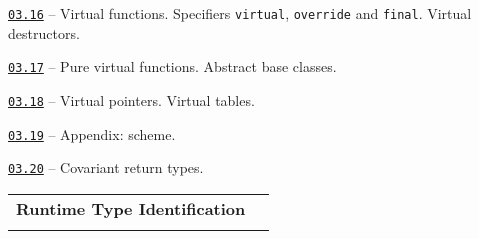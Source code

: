 \documentclass[a4paper,12pt]{article}
\renewenvironment{itemize}
{
    \begin{list}{\labelitemi}
    {
      \setlength{\topsep}{0pt}
      \setlength{\partopsep}{0pt}
      \setlength{\parskip}{0pt}
      \setlength{\itemsep}{0pt}
      \setlength{\parsep}{0pt}
      \setlength{\leftmargin}{14.5pt}
    }
}{\end{list}}
\begin{document}
\begin{itemize}

    \item \href{https://github.com/i-s-m-mipt/Education/blob/master/projects/examples/source/03.16.cpp}{\texttt{03.16}} -- Virtual functions. Specifiers \lstinline{virtual}, \lstinline{override} and \lstinline{final}. Virtual destructors.

    \smallskip

    \item \href{https://github.com/i-s-m-mipt/Education/blob/master/projects/examples/source/03.17.cpp}{\texttt{03.17}} -- Pure virtual functions. Abstract base classes.

    \smallskip

    \item \href{https://github.com/i-s-m-mipt/Education/blob/master/projects/examples/source/03.18.cpp}{\texttt{03.18}} -- Virtual pointers. Virtual tables.

    \smallskip

    \item \href{https://github.com/i-s-m-mipt/Education/blob/master/projects/examples/source/03.19.pdf}{\texttt{03.19}} -- Appendix: scheme.

    \smallskip

    \item \href{https://github.com/i-s-m-mipt/Education/blob/master/projects/examples/source/03.20.cpp}{\texttt{03.20}} -- Covariant return types.

\end{itemize}

\bigskip\medskip

\begin{tabular}{!{\vrule width 1pt}L{5.5cm}!{\vrule width 1pt}L{13.5cm}!{\vrule width 0pt}} 


\textbf{Runtime Type Identification} & \\


\end{tabular}

\medskip\smallskip
\end{document}
